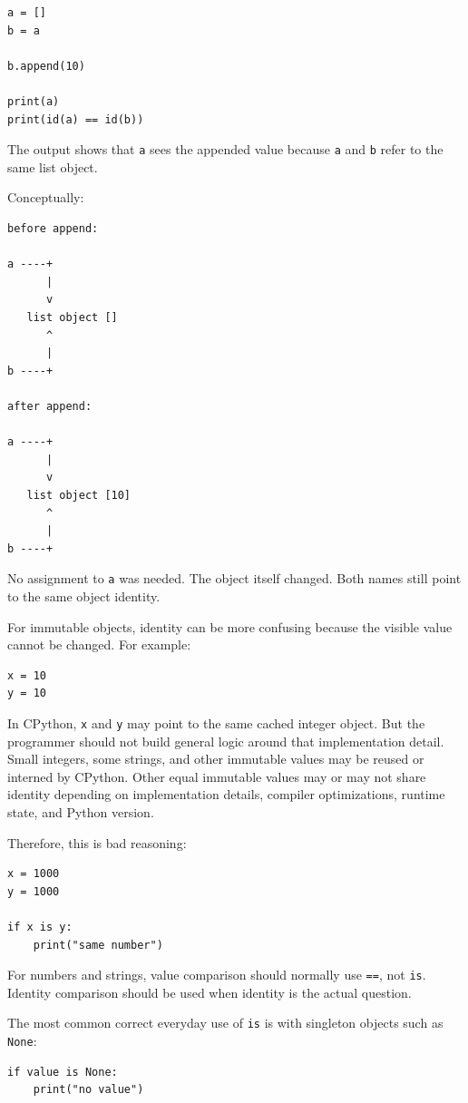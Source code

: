 \begin{verbatim}
a = []
b = a

b.append(10)

print(a)
print(id(a) == id(b))
\end{verbatim}

The output shows that \texttt{a} sees the appended value because \texttt{a} and \texttt{b} refer to the same list object.

Conceptually:

\begin{verbatim}
before append:

a ----+
      |
      v
   list object []
      ^
      |
b ----+

after append:

a ----+
      |
      v
   list object [10]
      ^
      |
b ----+
\end{verbatim}

No assignment to \texttt{a} was needed. The object itself changed. Both names still point to the same object identity.

For immutable objects, identity can be more confusing because the visible value cannot be changed. For example:

\begin{verbatim}
x = 10
y = 10
\end{verbatim}

In CPython, \texttt{x} and \texttt{y} may point to the same cached integer object. But the programmer should not build general logic around that implementation detail. Small integers, some strings, and other immutable values may be reused or interned by CPython. Other equal immutable values may or may not share identity depending on implementation details, compiler optimizations, runtime state, and Python version.

Therefore, this is bad reasoning:

\begin{verbatim}
x = 1000
y = 1000

if x is y:
    print("same number")
\end{verbatim}

For numbers and strings, value comparison should normally use \texttt{==}, not \texttt{is}. Identity comparison should be used when identity is the actual question.

The most common correct everyday use of \texttt{is} is with singleton objects such as \texttt{None}:

\begin{verbatim}
if value is None:
    print("no value")
\end{verbatim}

